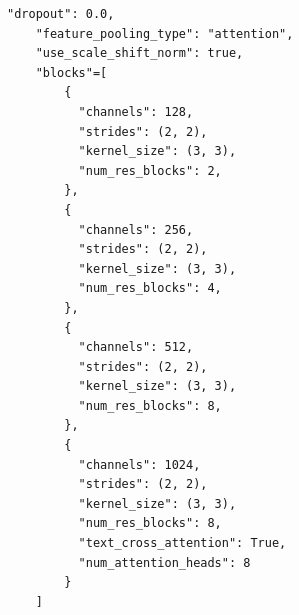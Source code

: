 \begin{Verbatim}[fontsize=\scriptsize]
    "dropout": 0.0,
    "feature_pooling_type": "attention",
    "use_scale_shift_norm": true,
    "blocks"=[
        {
          "channels": 128,
          "strides": (2, 2),
          "kernel_size": (3, 3),
          "num_res_blocks": 2,
        },
        {
          "channels": 256,
          "strides": (2, 2),
          "kernel_size": (3, 3),
          "num_res_blocks": 4,
        },
        {
          "channels": 512,
          "strides": (2, 2),
          "kernel_size": (3, 3),
          "num_res_blocks": 8,
        },
        {
          "channels": 1024,
          "strides": (2, 2),
          "kernel_size": (3, 3),
          "num_res_blocks": 8,
          "text_cross_attention": True,
          "num_attention_heads": 8
        }
    ]
\end{Verbatim}

\FloatBarrier
